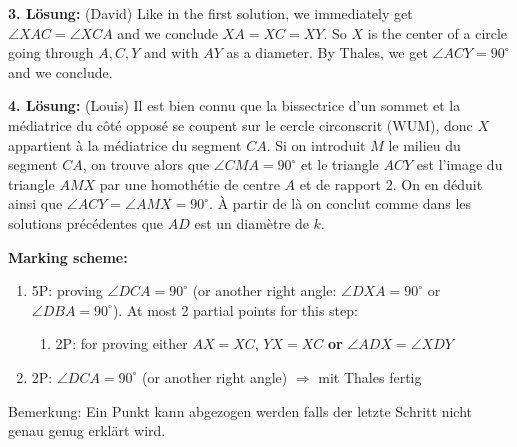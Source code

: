 {\textbf{3. Lösung:} (David)
Like in the first solution, we immediately get $\angle XAC=\angle XCA$ and we conclude $XA=XC=XY$. So $X$ is the center of a circle going through $A,C,Y$ and with $AY$ as a diameter. By Thales, we get $\angle ACY=90^\circ$ and we conclude.

\textbf{4. Lösung:} (Louis)
Il est bien connu que la bissectrice d'un sommet et la médiatrice du côté opposé se coupent sur le cercle circonscrit (WUM), donc $X$ appartient à la médiatrice du segment $CA$. Si on introduit $M$ le milieu du segment $CA$, on trouve alors que $\angle CMA = 90^{\circ}$ et le triangle $ACY$ est l'image du triangle $AMX$ par une homothétie de centre $A$ et de rapport $2$. On en déduit ainsi que $\angle ACY = \angle AMX = 90^{\circ}$. À partir de là on conclut comme dans les solutions précédentes que $AD$ est un diamètre de $k$.

\textbf{Marking scheme:}
\begin{enumerate}
\item 5P: proving $\angle DCA = 90^\circ$ (or another right angle: $\angle DXA = 90^\circ$ or $\angle DBA = 90^\circ$). At most 2 partial points for this step:
\begin{enumerate}
    \item 2P: for proving either $AX = XC$, $YX=XC$ \textbf{or} $\angle ADX = \angle XDY$
\end{enumerate}
\item 2P: $\angle DCA = 90^\circ$ (or another right angle) $\Rightarrow$ mit Thales fertig 
\end{enumerate}
Bemerkung: Ein Punkt kann abgezogen werden falls der letzte Schritt nicht genau genug erklärt wird.

}
